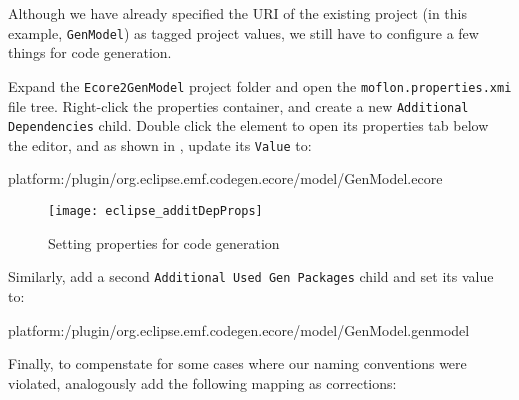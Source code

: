Although we have already specified the URI of the existing project (in this example, \texttt{GenModel}) as tagged project values, we still have to 
configure a few things for code generation.

\begin{stepbystep}
  
\item Expand the \texttt{Ecore2GenModel} project folder and open the \texttt{mof\-lon.\-prop\-er\-ties.\-xmi} file tree. Right-click the
properties container, and create a new \texttt{Add\-it\-ion\-al Dep\-en\-den\-cies} child. Double click the element to open its properties tab below the
editor, and as shown in , update its \texttt{Value} to:\\
\end{stepbystep}

\vspace{-1cm}
{\small \ttfamily  platform:/plugin/org.eclipse.emf.codegen.ecore/model/GenModel.ecore} \\
\vspace{-0.5cm}

\begin{figure}[htbp]
\begin{centering}
\texttt{[image: eclipse\_additDepProps]}
  \caption{Setting properties for code generation}  
  \label{eclipse:addDepChild}
\end{centering}
\end{figure} 

\begin{stepbystep}

\item Similarly, add a second \texttt{Additional Used Gen Packages} child and set its value to: \\
\end{stepbystep}

\vspace{-1cm}
{\small \ttfamily platform:\-/\-plugin/\-org.\-eclipse.\-emf.\-codegen.\-ecore/\-model/\-GenModel.\-genmodel}

\newpage
Finally, to compenstate for some cases where our naming conventions were violated, analogously add the following mapping as corrections:

